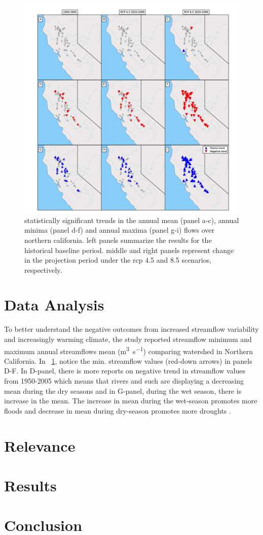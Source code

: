 \documentclass[a4paper,man,biblatex]{apa6}
\begin{document}
    \begin{figure}
        \centering
            \includegraphics[width=.75\textwidth]{stream_flow_cali}
            \caption{statistically significant trends in the annual mean (panel a-c), annual minima (panel d-f) and annual maxima (panel g-i) flows over northern california. left panels summarize the results for the historical baseline period. middle and right panels represent change in the projection period under the rcp 4.5 and 8.5 scenarios, respectively.\label{fig:stream_flow}}
    \end{figure}

\section{Data Analysis} To better understand the negative outcomes from increased streamflow variability and increasingly warming climate, the \textcite{mallakpour_2018} study reported streamflow minimum and maximum annual streamflows mean (\si{\cubic\meter\per\second}) comparing watershed in Northern California. In ~\ref{fig:stream_flow}, notice the min. streamflow values (red-down arrows) in panels D-F. In D-panel, there is more reports on negative trend in streamflow values from 1950-2005 which means that rivers and such are displaying a decreasing mean during the dry seasons and in G-panel, during the wet season, there is increase in the mean. The increase in mean during the wet-season promotes more floods and decrease in mean during dry-season promotes more droughts \autocite{mallakpour_2018}. 

\section{Relevance} 

\section{Results} 

\section{Conclusion}  

\printbibliography
\end{document}
